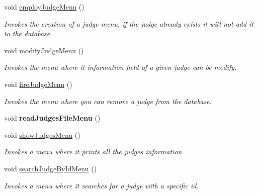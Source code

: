 \begin{DoxyCompactItemize}
\mbox{\label{class_company_m_s_a8b037b99128fcd555ac70c40dcea568c}} 
void \hyperlink{class_company_m_s_a8b037b99128fcd555ac70c40dcea568c}{employ\+Judge\+Menu} ()
\begin{DoxyCompactList}\small\item\em Invokes the creation of a judge menu, if the judge already exists it will not add it to the database. \end{DoxyCompactList}\item 
\mbox{\label{class_company_m_s_a1a46d464fa43376a19be1e7135384df3}} 
void \hyperlink{class_company_m_s_a1a46d464fa43376a19be1e7135384df3}{modify\+Judge\+Menu} ()
\begin{DoxyCompactList}\small\item\em Invokes the menu where it information field of a given judge can be modify. \end{DoxyCompactList}\item 
\mbox{\label{class_company_m_s_a767abe30cdc7caff9edadbfd54b23f11}} 
void \hyperlink{class_company_m_s_a767abe30cdc7caff9edadbfd54b23f11}{fire\+Judge\+Menu} ()
\begin{DoxyCompactList}\small\item\em Invokes the menu where you can remove a judge from the database. \end{DoxyCompactList}\item 
\mbox{\label{class_company_m_s_af7280b12c9cadc23acefeb4edc775fd7}} 
void {\bfseries read\+Judges\+File\+Menu} ()
\item 
\mbox{\label{class_company_m_s_a5f1d4b58f54605d217bc0333e49d36de}} 
void \hyperlink{class_company_m_s_a5f1d4b58f54605d217bc0333e49d36de}{show\+Judges\+Menu} ()
\begin{DoxyCompactList}\small\item\em Invokes a menu where it prints all the judges information. \end{DoxyCompactList}\item 
\mbox{\label{class_company_m_s_aea5677ef70d7f4ac431389b34a26925e}} 
void \hyperlink{class_company_m_s_aea5677ef70d7f4ac431389b34a26925e}{search\+Judge\+By\+Id\+Menu} ()
\begin{DoxyCompactList}\small\item\em Invokes a menu where it searches for a judge with a specific id. \end{DoxyCompactList}\item 

\end{DoxyCompactItemize}
